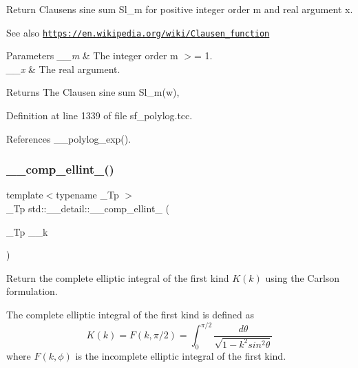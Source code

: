 Return Clausen\textquotesingle{}s sine sum Sl\+\_\+m for positive integer order m and real argument x. \begin{DoxySeeAlso}{See also}
\href{https://en.wikipedia.org/wiki/Clausen_function}{\tt https\+://en.\+wikipedia.\+org/wiki/\+Clausen\+\_\+function}
\end{DoxySeeAlso}

\begin{DoxyParams}{Parameters}
{\em \+\_\+\+\_\+m} & The integer order m $>$= 1. \\
\hline
{\em \+\_\+\+\_\+x} & The real argument. \\
\hline
\end{DoxyParams}
\begin{DoxyReturn}{Returns}
The Clausen sine sum Sl\+\_\+m(w), 
\end{DoxyReturn}


Definition at line 1339 of file sf\+\_\+polylog.\+tcc.



References \+\_\+\+\_\+polylog\+\_\+exp().

\mbox{\label{namespacestd_1_1____detail_a7b23bcf7e9f20b1e353a047126e13af1}} 
\subsubsection{\texorpdfstring{\+\_\+\+\_\+comp\+\_\+ellint\+\_()}{\_\_comp\_ellint\_1()}}
{\footnotesize\ttfamily template$<$typename \+\_\+\+Tp $>$ \\
\+\_\+\+Tp std\+::\+\_\+\+\_\+detail\+::\+\_\+\+\_\+comp\+\_\+ellint\+\_ (\begin{DoxyParamCaption}\item[{\+\_\+\+Tp}]{\+\_\+\+\_\+k }\end{DoxyParamCaption})}



Return the complete elliptic integral of the first kind $ K(k) $ using the Carlson formulation. 

The complete elliptic integral of the first kind is defined as \[ K(k) = F(k,\pi/2) = \int_0^{\pi/2}\frac{d\theta} {\sqrt{1 - k^2 sin^2\theta}} \] where $ F(k,\phi) $ is the incomplete elliptic integral of the first kind.


